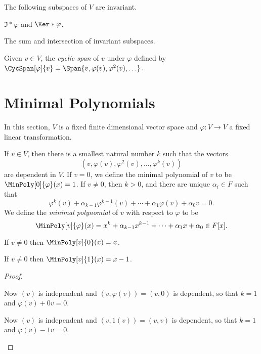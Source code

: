 \documentclass{memoir}
\begin{document}
\begin{prp}
The following subspaces of $V$ are invariant.
\begin{enumerate*}
\item $\Im*{\varphi}$ and $\Ker*{\varphi}$.
\item The sum and intersection of invariant subspaces.
\item Given $v \in V$, the \emph{cyclic span} of $v$ under $\varphi$ defined by $\CycSpan[\varphi]{v} = \Span{v, \varphi(v), \varphi^2(v), \ldots}$.
\end{enumerate*}
\end{prp}



\section{Minimal Polynomials}

In this section, $V$ is a fixed finite dimensional vector space and $\varphi : V \rightarrow V$ a fixed linear transformation.

\begin{dfn}
If $v \in V$, then there is a smallest natural number $k$ such that the vectors \[ (v, \varphi(v), \varphi^2(v), \ldots, \varphi^k(v))  \] are dependent in $V$. If $v=0$, we define the minimal polynomial of $v$ to be $\MinPoly[0]{\varphi}(x) = 1$. If $v \neq 0$, then $k>0$, and there are unique $\alpha_i \in F$ such that \[ \varphi^k(v) + \alpha_{k-1} \varphi^{k-1}(v) + \cdots + \alpha_1 \varphi(v) + \alpha_0 v = 0. \] We define the \emph{minimal polynomial} of $v$ with respect to $\varphi$ to be \[ \MinPoly[v]{\varphi}(x) = x^k + \alpha_{k-1} x^{k-1} + \cdots + \alpha_1 x + \alpha_0 \in F[x]. \]
\end{dfn}

\begin{prp} \mbox{}
\begin{enumerate*}
\item If $v \neq 0$ then $\MinPoly[v]{0}(x) = x$.
\item If $v \neq 0$ then $\MinPoly[v]{1}(x) = x-1$.
\end{enumerate*}
\end{prp}

\begin{proof} \mbox{}
\begin{enumerate*}
\item Now $(v)$ is independent and $(v, \varphi(v)) = (v,0)$ is dependent, so that $k = 1$ and $\varphi(v) + 0 v = 0$.
\item Now $(v)$ is independent and $(v,1(v)) = (v,v)$ is dependent, so that $k = 1$ and $\varphi(v) - 1 v = 0$. \qedhere
\end{enumerate*}
\end{proof}
\end{document}
